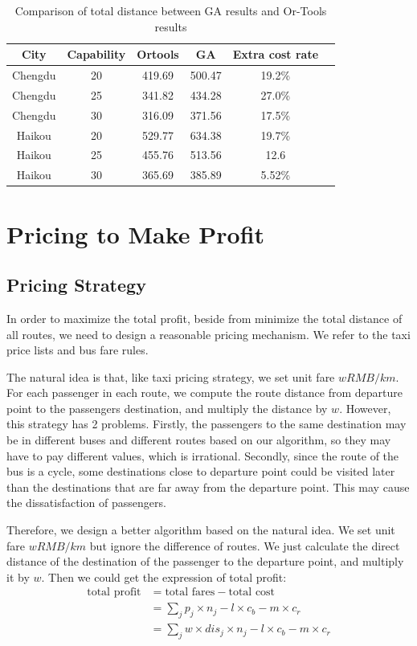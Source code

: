 \documentclass{llncs}
\begin{document}
\begin{table}
\caption{Comparison of total distance between GA results and Or-Tools results}\label{tab1}
\centering
\begin{tabular}{|c|c|c|c|c|c|}
\hline
City &  Capability & Ortools &  \textbf{GA} & \textbf{Extra cost rate}\\
\hline
Chengdu & 20 & 419.69&500.47 &  19.2\% \\
Chengdu & 25 &341.82 &434.28 &  27.0\%\\
Chengdu & 30 &316.09 & 371.56 & 17.5\% \\
Haikou & 20 & 529.77&  634.38 & 19.7\% \\
Haikou & 25 & 455.76& 513.56 & 12.6 \\
Haikou & 30 &365.69 &385.89 & 5.52\% \\
\hline
\end{tabular}
\end{table}

\section{Pricing to Make Profit}
\subsection{Pricing Strategy}
	In order to maximize the total profit, beside from minimize the total distance of all routes, we need to design a reasonable pricing mechanism. We refer to the taxi price lists and bus fare rules. 
	
	The natural idea is that, like taxi pricing strategy, we set unit fare $w RMB/km$. For each passenger in each route, we compute the route distance from departure point to the passengers destination, and multiply the distance by $w$. However, this strategy has 2 problems. Firstly, the passengers to the same destination may be in different buses and different routes based on our algorithm, so they may have to pay different values, which is irrational. Secondly, since the route of the bus is a cycle, some destinations close to departure point could be visited later than the destinations that are far away from the departure point. This may cause the dissatisfaction of passengers.
	
	Therefore, we design a better algorithm based on the natural idea. We set unit fare $w RMB/km$ but ignore the difference of routes. We just calculate the direct distance of the destination of the passenger to the departure point, and multiply it by $w$. Then we could get the expression of total profit:
	\begin{align}\label{cost}
	\text{total profit}&=\text{total fares}-\text{total cost}\nonumber\\
	&=\sum_{j}p_j\times n_j-l\times c_b-m\times c_r\nonumber\\
	&=\sum_{j}w\times dis_{j}\times n_j-l\times c_b-m\times c_r
	\end{align}
	
\end{document}
